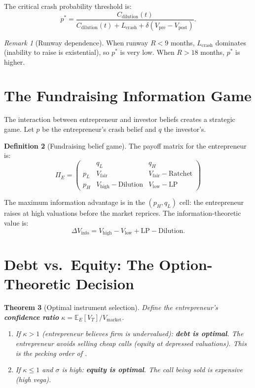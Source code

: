 \documentclass[12pt,a4paper,oneside]{book}
\newtheorem{theorem}{Theorem}[chapter]
\theoremstyle{definition}
\newtheorem{definition}[theorem]{Definition}
\theoremstyle{remark}
\newtheorem{remark}[theorem]{Remark}
\newcommand{\E}{\mathbb{E}}
\begin{document}
The critical crash probability threshold is:
\begin{equation}\label{eq:p_star}
  p^* = \frac{C_{\text{dilution}}(t)}
    {C_{\text{dilution}}(t) + L_{\text{crash}}
    + \delta(V_{\text{pre}} - V_{\text{post}})}.
\end{equation}

\begin{remark}[Runway dependence]
When runway $R < 9$ months, $L_{\text{crash}}$ dominates (inability to raise is
existential), so $p^*$ is very low. When $R > 18$ months, $p^*$ is higher.
\end{remark}

\section{The Fundraising Information Game}

The interaction between entrepreneur and investor beliefs creates a strategic game.
Let $p$ be the entrepreneur's crash belief and $q$ the investor's.

\begin{definition}[Fundraising belief game]
The payoff matrix for the entrepreneur is:
\begin{equation}\label{eq:fundraise_game}
  \Pi_E =
  \begin{pmatrix}
    & q_L & q_H \\
    p_L & V_{\text{fair}} & V_{\text{fair}} - \text{Ratchet} \\
    p_H & V_{\text{high}} - \text{Dilution} & V_{\text{low}} - \text{LP}
  \end{pmatrix}
\end{equation}
\end{definition}

The maximum information advantage is in the $(p_H, q_L)$ cell: the entrepreneur
raises at high valuations before the market reprices. The information-theoretic value is:
\begin{equation}\label{eq:info_value_cell}
  \Delta V_{\text{info}} = V_{\text{high}} - V_{\text{low}} + \text{LP} - \text{Dilution}.
\end{equation}

\section{Debt vs.\ Equity: The Option-Theoretic Decision}

\begin{theorem}[Optimal instrument selection]\label{thm:instrument}
Define the entrepreneur's \textbf{confidence ratio}
$\kappa = \E_E[V_T] / V_{\text{market}}$.
\begin{enumerate}[nosep]
  \item If $\kappa > 1$ (entrepreneur believes firm is undervalued):
    \textbf{debt is optimal}. The entrepreneur avoids selling cheap calls
    (equity at depressed valuations). This is the pecking order of
    \citet{MyersMajluf1984}.
  \item If $\kappa \leq 1$ and $\sigma$ is high:
    \textbf{equity is optimal}. The call being sold is expensive (high vega).
\end{enumerate}
\end{theorem}
\end{document}
